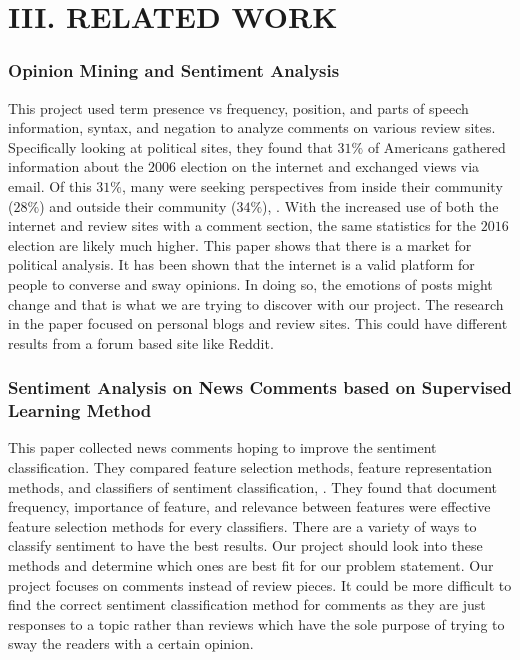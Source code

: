 \documentclass[letterpaper]{article}
\begin{document}
\section{III. RELATED WORK}

\subsubsection{Opinion Mining and Sentiment Analysis}
This project used term presence vs frequency, position, and parts of speech information, syntax, and negation to analyze comments on various review sites. Specifically looking at political sites, they found that $31\%$ of Americans gathered information about the $2006$ election on the internet and exchanged views via email. Of this $31\%$, many were seeking perspectives from inside their community ($28\%$) and outside their community ($34\%$), \cite{OpinionMining}. With the increased use of both the internet and review sites with a comment section, the same statistics for the $2016$ election are likely much higher.
This paper shows that there is a market for political analysis. It has been shown that the internet is a valid platform for people to converse and sway opinions. In doing so, the emotions of posts might change and that is what we are trying to discover with our project.
The research in the paper focused on personal blogs and review sites. This could have different results from a forum based site like Reddit.

\subsubsection{Sentiment Analysis on News Comments based on Supervised Learning Method}
This paper collected news comments hoping to improve the sentiment classification. They compared feature selection methods, feature representation methods, and classifiers of sentiment classification, \cite{SentimentAnalysis}. They found that document frequency, importance of feature, and relevance between features were effective feature selection methods for every classifiers. 
There are a variety of ways to classify sentiment to have the best results. Our project should look into these methods and determine which ones are best fit for our problem statement.
Our project focuses on comments instead of review pieces. It could be more difficult to find the correct sentiment classification method for comments as they are just responses to a topic rather than reviews which have the sole purpose of trying to sway the readers with a certain opinion.
\end{document}
